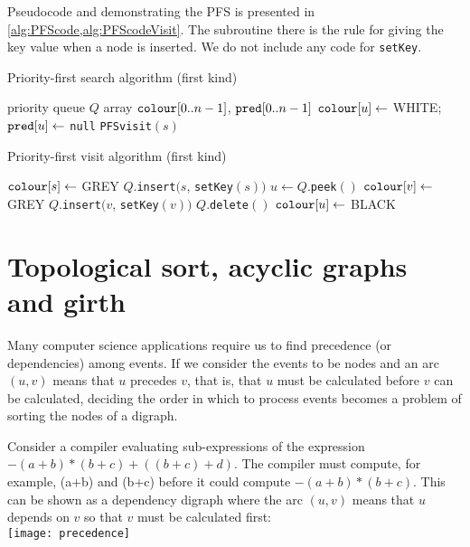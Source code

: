 Pseudocode  and  demonstrating the PFS is presented in \cref{alg:PFScode,alg:PFScodeVisit}. 
The subroutine  there is the rule for giving the key value when a node is inserted. 
We do not include any code for \texttt{setKey}.

\begin{algorithm}[H]
  \caption{Priority-first search algorithm (first kind)}
  \label{alg:PFScode}
\begin{algorithmic}[1]
	\State priority queue $Q$  
	\State array $\operatorname{\text{\texttt{colour}}}[0..n-1]$, $\operatorname{\text{\texttt{pred}}}[0..n-1]$
		\State $\operatorname{\text{\texttt{colour}}}[u] \gets $ WHITE; $\operatorname{\text{\texttt{pred}}}[u] \gets $ \texttt{null}
	\EndFor
			\State \texttt{PFSvisit}$(s)$
		\EndIf
	\EndFor
	\State \Return{$\pred$}
\EndFunction
\end{algorithmic}
\end{algorithm}

\begin{algorithm}[H]
  \caption{Priority-first visit algorithm (first kind)}
  \label{alg:PFScodeVisit}
  \begin{algorithmic}[1]
	\State $\operatorname{\text{\texttt{colour}}}[s] \gets $ GREY 
	\State $Q$.\texttt{insert}$(s$, \texttt{setKey}$(s))$
		\State $u \gets Q$.\texttt{peek}$()$
			\State $\operatorname{\text{\texttt{colour}}}[v] \gets $ GREY
			\State $Q$.\texttt{insert}$(v$, \texttt{setKey}$(v))$
		\Else
			\State $Q$.\texttt{delete}$()$
			\State $\operatorname{\text{\texttt{colour}}}[u] \gets$ BLACK
		\EndIf
	\EndWhile
\EndFunction
\end{algorithmic}
\end{algorithm}


\chapter{Topological sort, acyclic graphs and girth} %
Many computer science applications require us to find precedence (or dependencies) among events. 
If we consider the events to be nodes and an arc $(u,v)$ means that $u$ precedes $v$, that is, 
that $u$ must be calculated before $v$ can be calculated, 
deciding the order in which to process events becomes a problem of sorting the nodes of a digraph.

\begin{Boxample}[0]
Consider a compiler evaluating sub-expressions of the expression $-(a+b) * (b+c) + ((b+c)+d)$.  
The compiler must compute, for example, (a+b) and (b+c) before it could compute $-(a+b) * (b+c)$. 
This can be shown as a dependency digraph where the arc $(u,v)$ means 
that $u$ depends on $v$ so that $v$ must be calculated first:\\
\texttt{[image: precedence]}
\end{Boxample}

